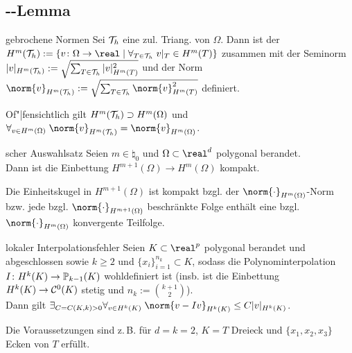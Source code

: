 \subsection{%
    --Lemma%
}

\begin{Def}{gebrochene Normen}
    Sei $\mathcal{T}_h$ eine zul. Triang. von $\Omega$.
    Dann ist der 
    $H^m(\T_h) := \{v\colon \Omega \to \real \;|\; \forall_{T \in \T_h}\; v|_T \in H^m(T)\}$
    zusammen mit der Seminorm\\
    $|v|_{H^m(\mathcal{T}_h)} := \sqrt{\sum_{T \in \mathcal{T}_h} |v|_{H^m(T)}^2}$
    und der Norm $\norm{v}_{H^m(\T_h)} := \sqrt{\sum_{T \in \T_h} \norm{v}_{H^m(T)}^2}$ definiert.
\end{Def}

\begin{Bem}
    Of"|fensichtlich gilt $H^m(\mathcal{T}_h) \supset H^m(\Omega)$ und
    $\forall_{v \in H^m(\Omega)}\; \norm{v}_{H^m(\T_h)} = \norm{v}_{H^m(\Omega)}$.
\end{Bem}

\begin{Satz}{scher Auswahlsatz}
    Seien $m \in \natural_0$ und $\Omega \subset \real^d$ polygonal berandet.\\
    Dann ist die Einbettung $H^{m+1}(\Omega) \to H^m(\Omega)$ kompakt.
\end{Satz}

\begin{Bem}
    Die Einheitskugel in $H^{m+1}(\Omega)$ ist kompakt bzgl. der
    $\norm{\cdot}_{H^m(\Omega)}$-Norm bzw.
    jede bzgl. $\norm{\cdot}_{H^{m+1}(\Omega)}$ beschränkte Folge enthält eine
    bzgl. $\norm{\cdot}_{H^m(\Omega)}$ konvergente Teilfolge.
\end{Bem}

\linie

\begin{Satz}{lokaler Interpolationsfehler}
    Seien $K \subset \real^p$ polygonal berandet und abgeschlossen
    sowie $k \ge 2$ und $\{x_i\}_{i=1}^{n_k} \subset K$, sodass
    die Polynominterpolation $I\colon H^k(K) \to \mathbb{P}_{k-1}(K)$ wohldefiniert ist
    (insb. ist die Einbettung $H^k(K) \to \mathcal{C}^0(K)$ stetig und $n_k := \binom{k+1}{2}$).\\
    Dann gilt $\exists_{C = C(K, k) > 0}
    \forall_{v \in H^k(K)}\; \norm{v - Iv}_{H^k(K)} \le C |v|_{H^k(K)}$.
\end{Satz}

\begin{Bem}
    Die Voraussetzungen sind z.\,B. für $d = k = 2$, $K = T$ Dreieck
    und $\{x_1, x_2, x_3\}$ Ecken von $T$ erfüllt.
\end{Bem}

